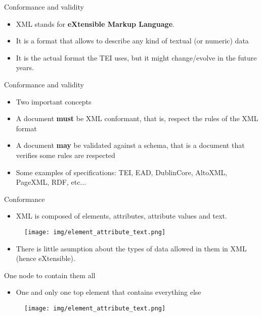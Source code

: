 \documentclass[11pt,aspectratio=1610]{beamer}
\begin{document}
\begin{frame}{Conformance and validity}
\begin{itemize}
\item XML stands for \textbf{eXtensible Markup Language}.
\item It is a format that allows to describe any kind of textual (or numeric) data 
\item It is the actual format the TEI uses, but it might change/evolve in the future years.
\end{itemize}
\end{frame}

\begin{frame}{Conformance and validity}
\begin{itemize}
\item Two important concepts
\item A document \textbf{must} be XML conformant, that is, respect the rules of the XML format
\item A document \textbf{may} be validated against a schema, that is a document that verifies some rules are respected
\item Some examples of specifications: TEI, EAD, DublinCore, AltoXML, PageXML, RDF, etc...
\end{itemize}
\end{frame}


\begin{frame}{Conformance}
\begin{itemize}
\item XML is composed of elements, attributes, attribute values and text.
\end{itemize}
\begin{center}
\begin{figure}
\texttt{[image: img/element\_attribute\_text.png]}
\end{figure}
\end{center}
\begin{itemize}
\item There is little asumption about the types of data allowed in them in XML (hence eXtensible).
\end{itemize}
\end{frame}


\begin{frame}{One node to contain them all}
\begin{itemize}
\item One and only one top element that contains everything else
\end{itemize}
\begin{center}
\begin{figure}
\texttt{[image: img/element\_attribute\_text.png]}
\end{figure}
\end{center}
\end{frame}
\end{document}
